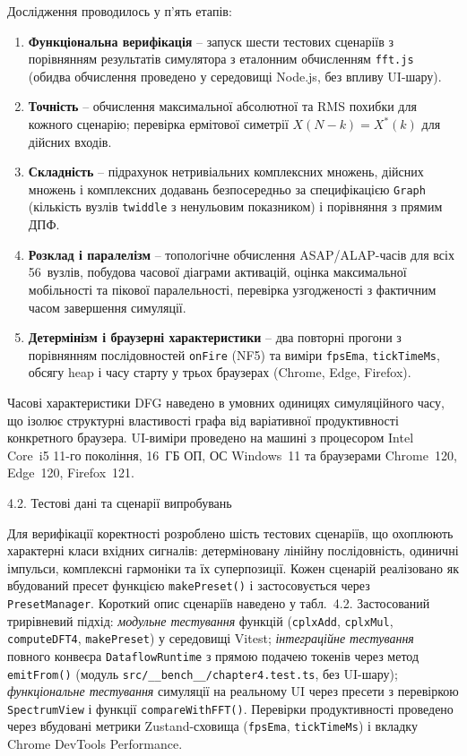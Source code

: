 \documentclass[
]{article}
\begin{document}
Дослідження проводилось у п'ять етапів:

\begin{enumerate}
\def\labelenumi{\arabic{enumi}.}
\item
  \textbf{Функціональна верифікація} -- запуск шести тестових сценаріїв
  з порівнянням результатів симулятора з еталонним обчисленням
  \texttt{fft.js} (обидва обчислення проведено у середовищі Node.js,
  без впливу UI-шару).
\item
  \textbf{Точність} -- обчислення максимальної абсолютної та RMS похибки
  для кожного сценарію; перевірка ермітової симетрії \(X(N-k) = X^{*}(k)\)
  для дійсних входів.
\item
  \textbf{Складність} -- підрахунок нетривіальних комплексних множень,
  дійсних множень і комплексних додавань безпосередньо за специфікацією
  \texttt{Graph} (кількість вузлів \texttt{twiddle} з ненульовим
  показником) і порівняння з прямим ДПФ.
\item
  \textbf{Розклад і паралелізм} -- топологічне обчислення ASAP/ALAP-часів
  для всіх 56~вузлів, побудова часової діаграми активацій, оцінка
  максимальної мобільності та пікової паралельності, перевірка
  узгодженості з фактичним часом завершення симуляції.
\item
  \textbf{Детермінізм і браузерні характеристики} -- два повторні
  прогони з порівнянням послідовностей \texttt{onFire} (NF5) та виміри
  \texttt{fpsEma}, \texttt{tickTimeMs}, обсягу heap і часу старту у трьох
  браузерах (Chrome, Edge, Firefox).
\end{enumerate}

Часові характеристики DFG наведено в умовних одиницях симуляційного
часу, що ізолює структурні властивості графа від варіативної
продуктивності конкретного браузера. UI-виміри проведено на машині з
процесором Intel Core~i5 11-го покоління, 16~ГБ ОП, ОС
Windows~11 та браузерами Chrome~120, Edge~120, Firefox~121.

\protect{}\label{_Toc229681166}{}4.2. Тестові дані та
сценарії випробувань

Для верифікації коректності розроблено шість тестових сценаріїв, що
охоплюють характерні класи вхідних сигналів: детерміновану лінійну
послідовність, одиничні імпульси, комплексні гармоніки та їх
суперпозиції. Кожен сценарій реалізовано як вбудований пресет функцією
\texttt{makePreset}\texttt{()} і застосовується через
\texttt{PresetManager}. Короткий опис сценаріїв наведено у
табл.~4.2. Застосований трирівневий підхід: \emph{модульне тестування}
функцій (\texttt{cplxAdd}, \texttt{cplxMul}, \texttt{computeDFT4},
\texttt{makePreset}) у середовищі Vitest; \emph{інтеграційне
тестування} повного конвеєра \texttt{DataflowRuntime} з прямою подачею
токенів через метод \texttt{emitFrom()} (модуль
\texttt{src}\texttt{/\_\_bench\_\_/}\texttt{chapter4.test.ts}, без
UI-шару); \emph{функціональне тестування} симуляції на реальному UI
через пресети з перевіркою \texttt{SpectrumView} і функції
\texttt{compareWithFFT}\texttt{()}. Перевірки продуктивності проведено
через вбудовані метрики Zustand-сховища (\texttt{fpsEma},
\texttt{tickTimeMs}) і вкладку Chrome DevTools Performance.
\end{document}
